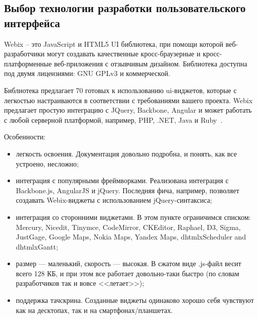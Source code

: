 \subsection{Выбор технологии разработки пользовательского интерфейса}
\label{sec:modeling:ui_technology}

Webix -- это JavaScript и HTML5 UI библиотека, при помощи которой веб-разработчики могут создавать качественные кросс-браузерные и кросс-платформенные веб-приложения с отзывчивым дизайном. Библиотека доступна под двумя лицензиями: GNU GPLv3 и коммерческой.

Библиотека предлагает 70 готовых к использованию ui-виджетов, которые с легкостью настраиваются в соответствии с требованиями вашего проекта. Webix предлагает простую интеграцию с JQuery, Backbone, Angular и может работать с любой серверной платформой, например, PHP, .NET, Java и Ruby~\cite{what_is_webix}.

Особенности:

\begin{itemize}
    \item легкость освоения. Документация довольно подробна, и понять, как все устроено, несложно;
    \item интеграция с популярными фреймворками. Реализована интеграция с Backbone.js, AngularJS и jQuery. Последняя фича, например, позволяет создавать Webix-виджеты с использованием jQuery-синтаксиса;
    \item интеграция со сторонними виджетами. В этом пункте ограничимся списком: Mercury, Nicedit, Tinymce, CodeMirror, CKEditor, Raphael, D3, Sigma, JustGage, Google Maps, Nokia Maps, Yandex Maps, dhtmlxScheduler and dhtmlxGantt;
    \item размер — маленький, скорость — высокая. В сжатом виде .js-файл весит всего 128 КБ, и при этом все работает довольно-таки быстро (по словам разработчиков так и вовсе <<летает>>);
    \item поддержка тачскрина. Созданные виджеты одинаково хорошо себя чувствуют как на десктопах, так и на смартфонах/планшетах.
\end{itemize}

